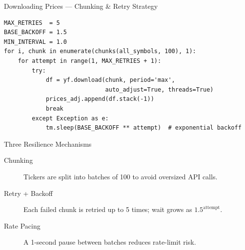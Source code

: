 \documentclass[aspectratio=169]{beamer}
\begin{document}
\begin{frame}[fragile]{Downloading Prices --- Chunking \& Retry Strategy}
\footnotesize
\begin{lstlisting}
MAX_RETRIES  = 5
BASE_BACKOFF = 1.5
MIN_INTERVAL = 1.0
for i, chunk in enumerate(chunks(all_symbols, 100), 1):
    for attempt in range(1, MAX_RETRIES + 1):
        try:
            df = yf.download(chunk, period='max',
                             auto_adjust=True, threads=True)
            prices_adj.append(df.stack(-1))
            break
        except Exception as e:
            tm.sleep(BASE_BACKOFF ** attempt)  # exponential backoff
\end{lstlisting}

\normalsize
\begin{block}{Three Resilience Mechanisms}
\begin{description}
  \item[Chunking] Tickers are split into batches of 100 to avoid oversized API calls.
  \item[Retry + Backoff] Each failed chunk is retried up to 5 times; wait grows as $1.5^{\text{attempt}}$.
  \item[Rate Pacing] A 1-second pause between batches reduces rate-limit risk.
\end{description}
\end{block}

\end{frame}
%
%
\end{document}
